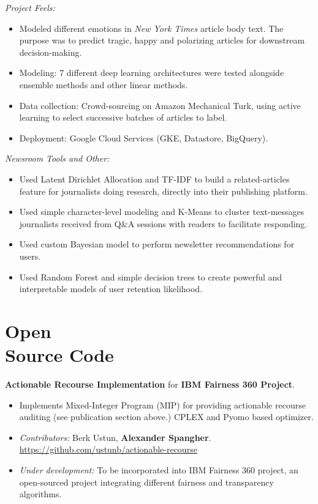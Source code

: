 \documentclass[margin]{res}
\begin{document}
\begin{resume}
\textit{Project Feels:} 
\begin{itemize}
	\item Modeled different emotions in \textit{New York Times} article body text. The purpose was to predict tragic, happy and polarizing articles for downstream decision-making.
	\item Modeling: 7 different deep learning architectures were tested alongside ensemble methods and other linear methods. 
	\item Data collection: Crowd-sourcing on Amazon Mechanical Turk, using active learning to select successive batches of articles to label.
	\item Deployment: Google Cloud Services (GKE, Datastore, BigQuery).
\end{itemize}

\textit{Newsroom Tools and Other:}
\begin{itemize}
	\item Used Latent Dirichlet Allocation and TF-IDF to build a related-articles feature for journalists doing research, directly into their publishing platform.
	\item Used simple character-level modeling and K-Means to cluster text-messages journalists received from Q\&A sessions with readers to facilitate responding.
	\item Used custom Bayesian model to perform newsletter recommendations for users.
	\item Used Random Forest and simple decision trees to create powerful and interpretable models of user retention likelihood.
\end{itemize}
 


\section{Open\\Source Code}
\textbf{Actionable Recourse Implementation} for \textbf{IBM Fairness 360 Project}. 
\begin{itemize}
	\item Implements Mixed-Integer Program (MIP) for providing actionable recourse auditing (see publication section above.) CPLEX and Pyomo based optimizer. 
	\item \textit{Contributors:} Berk Ustun, \textbf{Alexander Spangher}. \url{https://github.com/ustunb/actionable-recourse}
	\item \textit{Under development:} To be incorporated into IBM Fairness 360 project, an open-sourced project integrating different fairness and transparency algorithms.
\end{itemize} 


\end{resume}
\end{document}
